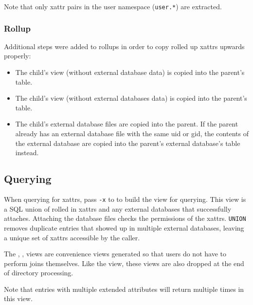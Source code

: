Note that only xattr pairs in the user namespace (\texttt{user.*}) are
extracted.

\subsubsection{Rollup}
Additional steps were added to rollups in order to copy rolled up
xattrs upwards properly:

\begin{itemize}
\item The child's \xattrsavail view (without external database data)
  is copied into the parent's \xattrsrollup table.
\item The child's \xattrfiles view (without external databases data)
  is copied into the parent's \xattrfilesrollup table.
\item The child's external database files are copied into the
  parent. If the parent already has an external database file with the
  same uid or gid, the contents of the external database are copied
  into the parent's external database's \xattrsrollup table instead.
\end{itemize}

\subsection{Querying}
When querying for xattrs, pass \texttt{-x} to \gufiquery to build the
\xattrs view for querying. This view is a SQL union of rolled in
xattrs and any external databases that successfully
attaches. Attaching the database files checks the permissions of the
xattrs. \texttt{UNION} removes duplicate entries that showed up in
multiple external databases, leaving a unique set of xattrs accessible
by the caller.

The \xentries, \xpentries, \xsummary views are convenience views
generated so that users do not have to perform joins themselves. Like
the \xattrs view, these views are also dropped at the end of directory
processing.

Note that entries with multiple extended attributes will return
multiple times in this view.
